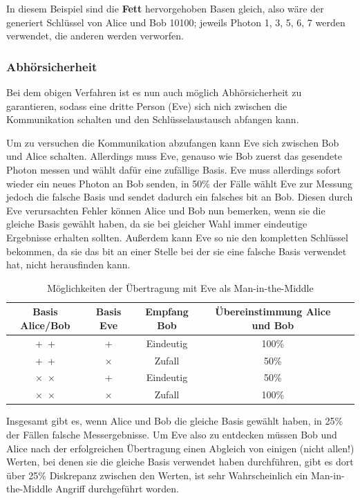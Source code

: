 In diesem Beispiel sind die \textbf{Fett} hervorgehoben Basen gleich, also wäre der generiert Schlüssel von Alice und Bob 10100; jeweils Photon 1, 3, 5, 6, 7 werden verwendet, die anderen werden verworfen.


\subsubsection{Abhörsicherheit}

Bei dem obigen Verfahren ist es nun auch möglich Abhörsicherheit zu garantieren, sodass eine dritte Person (Eve) sich nich zwischen die Kommunikation schalten und den Schlüsselaustausch abfangen kann.

Um zu versuchen die Kommunikation abzufangen kann Eve sich zwischen Bob und Alice schalten.
Allerdings muss Eve, genauso wie Bob zuerst das gesendete Photon messen und wählt dafür eine zufällige Basis.
Eve muss allerdings sofort wieder ein neues Photon an Bob senden, in 50\% der Fälle wählt Eve zur Messung jedoch die falsche Basis und sendet dadurch ein falsches bit an Bob.
Diesen durch Eve verursachten Fehler können Alice und Bob nun bemerken, wenn sie die gleiche Basis gewählt haben, da sie bei gleicher Wahl immer eindeutige Ergebnisse erhalten sollten.
Außerdem kann Eve so nie den kompletten Schlüssel bekommen, da sie das bit an einer Stelle bei der sie eine falsche Basis verwendet hat, nicht herausfinden kann.

\begin{table}[ht]
    \centering
    \begin{tabular}{|c|c|c|c|c|}
    \hline
    Basis Alice/Bob     & Basis Eve & Empfang Bob   & Übereinstimmung Alice und Bob \\ \hline
    +~+                 & +         & Eindeutig     & 100\% \\ \hline
    +~+                 & $\times$  & Zufall        & 50\%  \\ \hline 
    $\times$~$\times$   & +         & Eindeutig     & 50\%  \\ \hline
    $\times$~$\times$   & $\times$  & Zufall        & 100\% \\ \hline
    
    \end{tabular}
    \caption{Möglichkeiten der Übertragung mit Eve als Man-in-the-Middle \cite{quantenschluesselaustausch}}
    \label{table:eve-moeglichkeiten}
\end{table}

Insgesamt gibt es, wenn Alice und Bob die gleiche Basis gewählt haben, in 25\% der Fällen falsche Messergebnisse. 
Um Eve also zu entdecken müssen Bob und Alice nach der erfolgreichen Übertragung einen Abgleich von einigen (nicht allen!) Werten, bei denen sie die gleiche Basis verwendet haben durchführen, gibt es dort über 25\% Diskrepanz zwischen den Werten, ist sehr Wahrscheinlich ein Man-in-the-Middle Angriff durchgeführt worden.


